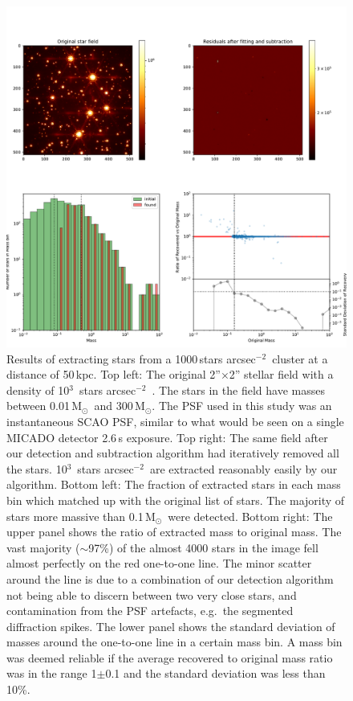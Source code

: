 \documentclass[referee]{aa}
\newcommand{\msun}{M$_\odot$~}
\newcommand{\msune}{M$_\odot$}
\newcommand{\s}{$\sim$}
\newcommand{\h}[1]{$^{#1}$}
\newcommand{\spa}{stars arcsec$^{-2}$~}
\begin{document}
\begin{appendix}
\begin{figure}
    \centering
    \includegraphics[width=\textwidth]{tbl_stats_dist=50000_rho=1000.pdf}
    \caption{Results of extracting stars from a 1000\,\spa cluster at a distance of 50\,kpc.
    Top left: The original 2''$\times$2'' stellar field with a density of 10\h3~\spa.
    The stars in the field have masses between 0.01\,\msun and 300\,\msune.
    The PSF used in this study was an instantaneous SCAO PSF, similar to what would be seen on a single MICADO detector 2.6\,s exposure.
    Top right: The same field after our detection and subtraction algorithm had iteratively removed all the stars.
    10\h3~\spa are extracted reasonably easily by our algorithm.
    Bottom left: The fraction of extracted stars in each mass bin which matched up with the original list of stars.
    The majority of stars more massive than 0.1\,\msun were detected.
    Bottom right: The upper panel shows the ratio of extracted mass to original mass.
    The vast majority (\s97\%) of the almost 4000 stars in the image fell almost perfectly on the red one-to-one line.
    The minor scatter around the line is due to a combination of our detection algorithm not being able to discern between two very close stars, and contamination from the PSF artefacts, e.g.\ the segmented diffraction spikes.
    The lower panel shows the standard deviation of masses around the one-to-one line in a certain mass bin.
    A mass bin was deemed reliable if the average recovered to original mass ratio was in the range 1$\pm$0.1 and the standard deviation was less than 10\%.}


\end{figure}
\end{appendix}
\end{document}
